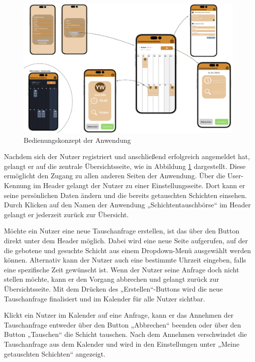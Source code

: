 \begin{figure}[h]
    \centering
    \includegraphics[clip,width=1\linewidth]{images/Bedienungskonzept_V1.png}
    \caption[Bedienungskonzept der Anwendung]{Bedienungskonzept der Anwendung}
    \label{Bedienungskonzept_V1}
\end{figure}

Nachdem sich der Nutzer registriert und anschließend erfolgreich angemeldet hat, gelangt er auf die zentrale Übersichtsseite, wie in Abbildung \ref{Bedienungskonzept_V1} dargestellt. 
Diese ermöglicht den Zugang zu allen anderen Seiten der Anwendung. 
Über die User-Kennung im Header gelangt der Nutzer zu einer Einstellungsseite. 
Dort kann er seine persönlichen Daten ändern und die bereits getauschten Schichten einsehen. 
Durch Klicken auf den Namen der Anwendung „Schichtentauschbörse“ im Header gelangt er jederzeit zurück zur Übersicht.

Möchte ein Nutzer eine neue Tauschanfrage erstellen, ist das über den Button direkt unter dem Header möglich. 
Dabei wird eine neue Seite aufgerufen, auf der die gebotene und gesuchte Schicht aus einem Dropdown-Menü ausgewählt werden können. 
Alternativ kann der Nutzer auch eine bestimmte Uhrzeit eingeben, falls eine spezifische Zeit gewünscht ist. 
Wenn der Nutzer seine Anfrage doch nicht stellen möchte, kann er den Vorgang abbrechen und gelangt zurück zur Übersichtsseite. 
Mit dem Drücken des „Erstellen“-Buttons wird die neue Tauschanfrage finalisiert und im Kalender für alle Nutzer sichtbar.

Klickt ein Nutzer im Kalender auf eine Anfrage, kann er das Annehmen der Tauschanfrage entweder über den Button „Abbrechen“ beenden oder über den Button „Tauschen“ die Schicht tauschen. 
Nach dem Annehmen verschwindet die Tauschanfrage aus dem Kalender und wird in den Einstellungen unter „Meine getauschten Schichten“ angezeigt.

